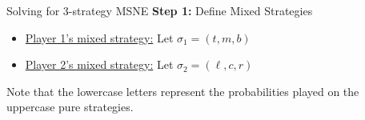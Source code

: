 
\begin{frame}{Solving for 3-strategy MSNE}
  \textbf{Step 1:} Define Mixed Strategies
  \begin{itemize}

    \item \underline{Player 1's mixed strategy:} 
    Let $\sigma_1 = (t, m, b)$  

    \item \underline{Player 2's mixed strategy:} 
    Let $\sigma_2 = (\ell, c, r)$  

  \end{itemize}
  
  Note that the lowercase letters represent the probabilities played
  on the uppercase pure strategies.
\end{frame}


